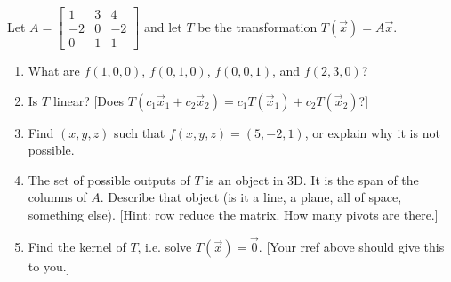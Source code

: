 {%
% 
%   
% 



}



\mysubsection{\idealin}
\begin{problem}
 Let
$A=
\begin{bmatrix}
 1&3&4\\
 -2&0&-2\\
 0&1&1
\end{bmatrix}
$ and let  $T$ be the transformation  $T(\vec x) = A\vec x$.
\begin{enumerate}
 \item What are $f(1,0,0)$, $f(0,1,0)$, $f(0,0,1)$, and $f(2,3,0)$? 
 \item Is  $T$ linear?  [Does $T(c_1\vec x_1+c_2\vec x_2) =c_1T(\vec x_1)+c_2T(\vec x_2)$?] 
 \item Find $(x,y,z)$ such that $f(x,y,z)=(5,-2,1)$, or explain why it is not possible.
 \item The set of possible outputs of $T$ is an object in 3D. It is the span of the columns of $A$. Describe that object (is it a line, a plane, all of space, something else). [Hint: row reduce the matrix. How many pivots are there.] 
 \item Find the kernel of $T$, i.e. solve $T(\vec x)=\vec 0$. [Your rref above should give this to you.]  
\end{enumerate}
\end{problem}

